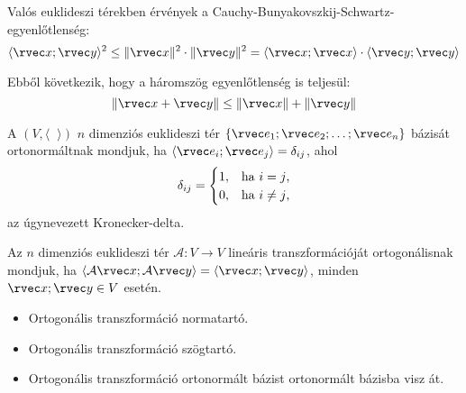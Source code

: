 \begin{note}
  Valós euklideszi térekben érvények a
  Cauchy-Bunyakovszkij-Schwartz-egyenlőtlenség:
  $$
    \langle \rvec x; \rvec y \rangle^2
    \leq \|\rvec x\|^2 \cdot \|\rvec y\|^2
    = \langle \rvec x; \rvec x \rangle \cdot \langle \rvec y; \rvec y \rangle
  $$

  Ebből következik, hogy a háromszög egyenlőtlenség is teljesül:
  $$
    \|\rvec x + \rvec y\| \leq \|\rvec x\| + \|\rvec y\|
  $$
\end{note}

\begin{definition}
  A $(V, \langle \phantom{x} \rangle)$ $n$ dimenziós euklideszi tér
  $\{ \rvec e_1; \rvec e_2; \ldots; \rvec e_n \}$ bázisát
  ortonormáltnak mondjuk, ha $\langle \rvec e_i; \rvec e_j \rangle =
    \delta_{ij}$, ahol
  $$
    \delta_{ij} = \begin{cases}
      1, & \text{ha } i = j    \text, \\
      0, & \text{ha } i \neq j \text,
    \end{cases}
  $$
  az úgynevezett Kronecker-delta.
\end{definition}

\begin{definition}
  Az $n$ dimenziós  euklideszi tér $\mathcal A: V \rightarrow V$ lineáris
  transzformációját ortogonálisnak mondjuk, ha $\langle \mathcal A \rvec x;
    \mathcal A \rvec y \rangle = \langle \rvec x; \rvec y \rangle$, minden $\rvec
    x; \rvec y \in V$ esetén.
\end{definition}

\begin{note}
  \begin{itemize}
    \item Ortogonális transzformáció normatartó.

    \item Ortogonális transzformáció szögtartó.

    \item Ortogonális transzformáció ortonormált bázist ortonormált bázisba visz
          át.
  \end{itemize}
\end{note}

